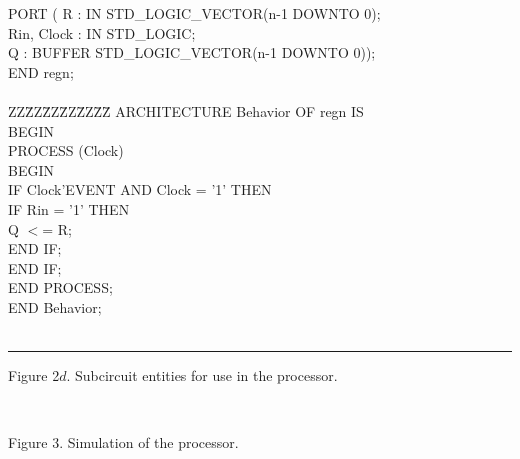 \documentclass[epsfig,10pt,fullpage]{article}
\begin{document}
\begin{center}
\begin{minipage}[t]{12.5 cm}
\begin{tabbing}
\>PORT ( \>R \>: IN \>STD\_LOGIC\_VECTOR(n-1 DOWNTO 0);\\
\>\>Rin, Clock \>: IN \>STD\_LOGIC;\\
\>\>Q \>: BUFFER \>STD\_LOGIC\_VECTOR(n-1 DOWNTO 0));\\
END regn;\\
~\\
ZZ\=ZZ\=ZZ\=ZZ\=ZZ\=ZZ\=\kill
ARCHITECTURE Behavior OF regn IS\\
BEGIN\\
\>PROCESS (Clock)\\
\>BEGIN\\
\>\>IF Clock'EVENT AND Clock = '1' THEN\\
\>\>\>IF Rin = '1' THEN\\
\>\>\>\>Q $<$= R;\\
\>\>\>END IF;\\
\>\>END IF;\\
\>END PROCESS;\\
END Behavior;\\
~\rule{5.0in}{0in}
\end{tabbing}
\end{minipage}
\end{center}

\begin{center}
Figure 2$d$. Subcircuit entities for use in the processor.
\end{center}

~\\
\begin{figure}[H]
\scriptsize
\centerline{
\hbox{}}
\end{figure}
\centerline{Figure 3.  Simulation of the processor.}
\end{document}
